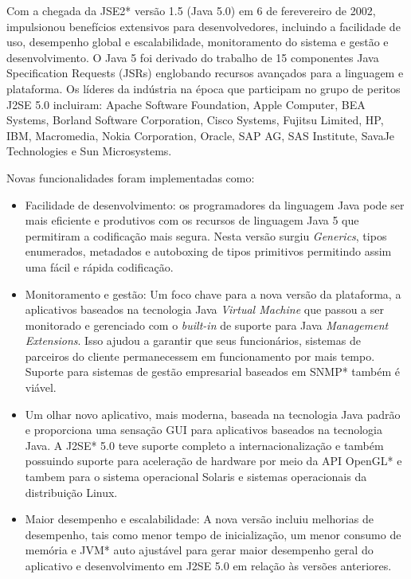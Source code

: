 Com a chegada da JSE2* versão 1.5 (Java 5.0) em 6 de ferevereiro de 2002, impulsionou benefícios extensivos para desenvolvedores, incluindo a facilidade de uso, desempenho global e escalabilidade, monitoramento do sistema e gestão e desenvolvimento. O Java 5 foi derivado do trabalho de 15 componentes Java Specification Requests (JSRs) englobando recursos avançados para a linguagem e plataforma. Os líderes da indústria na época que participam no grupo de peritos J2SE 5.0 incluiram: Apache Software Foundation, Apple Computer, BEA Systems, Borland Software Corporation, Cisco Systems, Fujitsu Limited, HP, IBM, Macromedia, Nokia Corporation, Oracle, SAP AG, SAS Institute, SavaJe Technologies e Sun Microsystems.

Novas funcionalidades foram implementadas como:

\begin{itemize}
  \item Facilidade de desenvolvimento: os programadores da linguagem Java pode ser mais eficiente e produtivos com os recursos de linguagem Java 5 que permitiram a codificação mais segura. Nesta versão surgiu {\it Generics}, tipos enumerados, metadados e autoboxing de tipos primitivos permitindo assim uma fácil e rápida codificação.
  \item Monitoramento e gestão: Um foco chave para a nova versão da plataforma, a aplicativos baseados na tecnologia Java {\it Virtual Machine} que passou a ser monitorado e gerenciado com o {\it built-in} de suporte para Java {\it Management Extensions}. Isso ajudou a garantir que seus funcionários, sistemas de parceiros do cliente permanecessem em funcionamento por mais tempo. Suporte para sistemas de gestão empresarial baseados em SNMP* também é viável.
  \item Um olhar novo aplicativo, mais moderna, baseada na tecnologia Java padrão e proporciona uma sensação GUI para aplicativos baseados na tecnologia Java. A J2SE* 5.0 teve suporte completo a internacionalização e também possuindo suporte para aceleração de hardware por meio da API OpenGL* e tambem para o sistema operacional Solaris e sistemas operacionais da distribuição Linux.
  \item Maior desempenho e escalabilidade: A nova versão incluiu melhorias de desempenho, tais como menor tempo de inicialização, um menor consumo de memória e JVM* auto ajustável para gerar maior desempenho geral do aplicativo e desenvolvimento em J2SE 5.0 em relação às versões anteriores.\\
\end{itemize}

